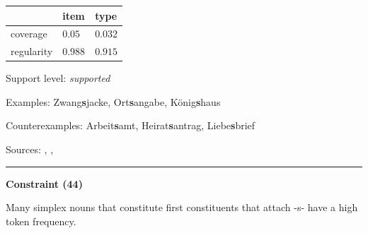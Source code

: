 \vspace{-0.25em}

\begin{table}[!ht]
\begin{center}
\setlength{\extrarowheight}{1pt}
\begin{tabularx}{\columnwidth}{|X|X|X|}
\hline
 & item & type \\
\hline
 coverage & $0.05$ & $0.032$ \\
\hline
 regularity & $0.988$ & $0.915$ \\
\hline
\end{tabularx}
\end{center}
\end{table}

\vspace{-1.35em}

\noindent
Support level: \textit{supported}

\vspace{0.3em}

\noindent
Examples: Zwang\textbf{s}jacke, Ort\textbf{s}angabe, König\textbf{s}haus

\noindent
Counterexamples: Arbeit\textbf{s}amt, Heirat\textbf{s}antrag, Liebe\textbf{s}brief

\vspace{0.3em}

\noindent
Sources: \citet[23]{kuerschner_2010}, \citet[79]{nuebling_szczepaniak_2013}, \citet[8]{schaefer_pankratz_2018}

\vspace{0.35em}
\hrule




\vspace{0.4em}

\begin{center}
\textbf{Constraint (44)}
\end{center}

\noindent
Many simplex nouns that constitute first constituents that attach -s- have a high token frequency.
\vspace{0.5em}



